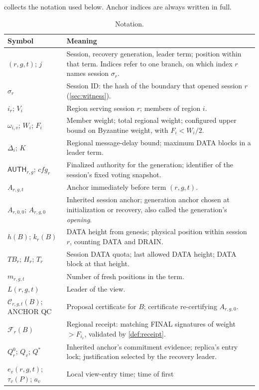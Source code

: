 \documentclass[11pt,a4paper]{article}
\newif\ifrevmarks
\newcommand{\Rv}[1]{\ifrevmarks\leavevmode{\color{rvBlue}#1}\else#1\fi}
\newcommand{\Cid}[1]{\ifrevmarks\textsuperscript{\hyperlink{chg:#1}{\color{rvBlue}\sffamily\scriptsize#1}}\fi}
\newcommand{\QC}{\mathcal C}
\newcommand{\FC}{\mathcal F}
\newcommand{\TB}{\mathit{TB}}
\newcommand{\tagg}[1]{\ensuremath{\mathsf{#1}}}
\begin{document}
 collects the notation used below. Anchor indices
are always written in full.
\begin{table}[htbp]\centering\small
\caption{Notation.}\label{tab:notation}
\begin{tabularx}{\linewidth}{@{}p{.29\linewidth}Y@{}}
\toprule Symbol & Meaning\\\midrule
$(r,g,t)$; $j$ & Session, recovery generation, leader term; position
within that term. \Rv{Indices refer to one branch, on which index $r$ names session $\sigma_r$.}\\
\Rv{$\sigma_r$} & \Rv{Session ID: the hash of the boundary that opened
session $r$ (\cref{sec:witness}).}\\
$i_r$; $V_i$ & Region serving session $r$; members of region $i$.\\
$\omega_{i,v}$; $W_i$; $F_i$ & Member weight; total regional weight;
\Rv{configured} upper bound on Byzantine weight, with $F_i<W_i/2$.\\
$\Delta_i$; $K$ & Regional message-delay bound; maximum DATA blocks
in a leader term.\\
$\tagg{AUTH}_{r,g}$; $\mathit{cfg}_r$ & Finalized authority for the
generation; identifier of the session's fixed voting snapshot.\\
$A_{r,g,t}$ & Anchor immediately before term $(r,g,t)$.\\
$A_{r,0,0}$; $A_{r,g,0}$ & Inherited session anchor; generation anchor
chosen at initialization or recovery\Rv{, also called the generation's
\emph{opening}}.\\
$h(B)$; $k_r(B)$ & DATA height from genesis; physical position within
session $r$, counting DATA and DRAIN.\\
$\TB_r$; $H_r$; $T_r$ & Session DATA quota; last allowed DATA height;
DATA block at that height.\\
$m_{r,g,t}$ & Number of fresh positions in the term.\\
$L(r,g,t)$ & Leader of the view.\\
$\QC_{r,g,t}(B)$; ANCHOR QC & Proposal certificate for $B$;
certificate re-certifying $A_{r,g,0}$.\\
$\FC_r(B)$ & Regional receipt: matching FINAL signatures of weight
$>F_{i_r}$, validated by \cref{def:receipt}.\\
$Q_r^0$; $Q_v$; $Q^*$ & Inherited anchor's commitment evidence; replica's entry
lock; justification selected by the recovery leader.\\
$e_v(r,g,t)$; $\tau_v(P)$; $a_v$ & Local view-entry time; time of first

\end{tabularx}
\end{table}
\end{document}
